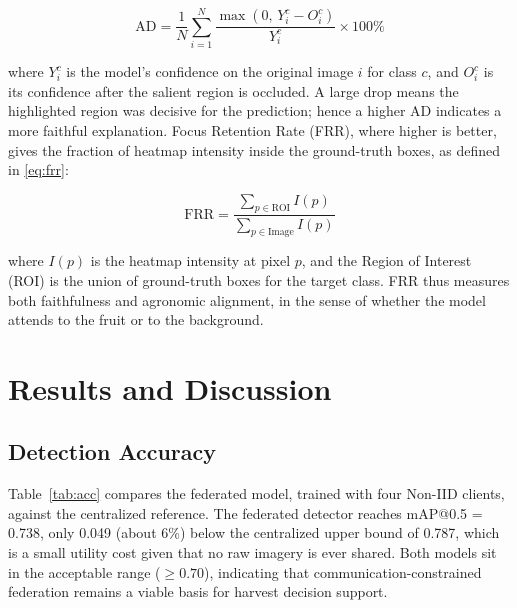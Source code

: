 \documentclass[conference, compsoc, twoside]{IEEEtran}
\begin{document}
\begin{equation}
\mathrm{AD} = \frac{1}{N} \sum_{i=1}^{N} \frac{\max(0,\, Y_i^c - O_i^c)}{Y_i^c} \times 100\%
\label{eq:ad}
\end{equation}

where $Y_i^c$ is the model's confidence on the original image $i$ for class $c$, and $O_i^c$ is its confidence after the salient region is occluded. A large drop means the highlighted region was decisive for the prediction; hence a higher AD indicates a more faithful explanation. Focus Retention Rate (FRR), where higher is better, gives the fraction of heatmap intensity inside the ground-truth boxes, as defined in \eqref{eq:frr}:

\begin{equation}
\mathrm{FRR} = \frac{\sum_{p \in \mathrm{ROI}} I(p)}{\sum_{p \in \mathrm{Image}} I(p)}
\label{eq:frr}
\end{equation}

where $I(p)$ is the heatmap intensity at pixel $p$, and the Region of Interest (ROI) is the union of ground-truth boxes for the target class. FRR thus measures both faithfulness and agronomic alignment, in the sense of whether the model attends to the fruit or to the background.

\section{Results and Discussion}

\subsection{Detection Accuracy}
Table~\ref{tab:acc} compares the federated model, trained with four Non-IID clients, against the centralized reference. The federated detector reaches mAP@0.5 = 0.738, only 0.049 (about 6\%) below the centralized upper bound of 0.787, which is a small utility cost given that no raw imagery is ever shared. Both models sit in the acceptable range ($\geq 0.70$), indicating that communication-constrained federation remains a viable basis for harvest decision support.

\begin{table}[!htbp]
\centering
\caption{Detection performance on the held-out test set. FL cost is computed as centralized minus federated.}
\label{tab:acc}
\small
\setlength{\tabcolsep}{3pt}
\end{table}
\end{document}
